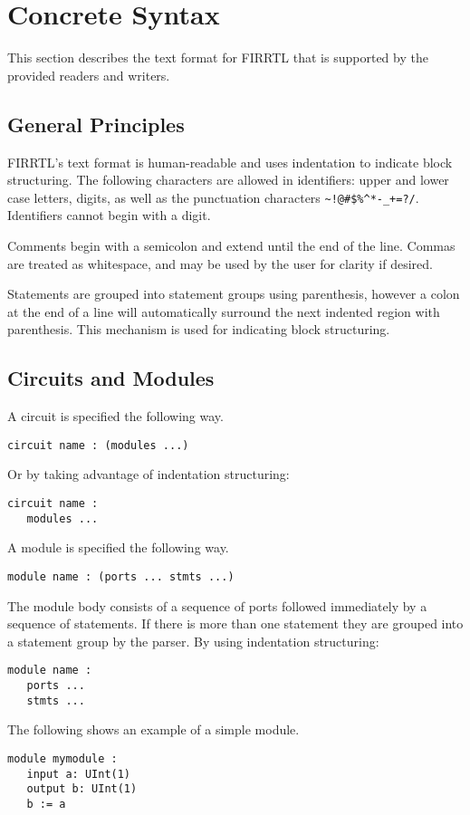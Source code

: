 \documentclass[12pt]{article}
\begin{document}
\section{Concrete Syntax}\label{concrete}
This section describes the text format for FIRRTL that is supported by the provided readers and writers.

\subsection*{General Principles}
FIRRTL's text format is human-readable and uses indentation to indicate block structuring.
The following characters are allowed in identifiers: upper and lower case letters, digits, as well as the punctuation characters \verb|~!@#$%^*-_+=?/|.
Identifiers cannot begin with a digit. 

Comments begin with a semicolon and extend until the end of the line.
Commas are treated as whitespace, and may be used by the user for clarity if desired. 

Statements are grouped into statement groups using parenthesis, however a colon at the end of a line will automatically surround the next indented region with parenthesis.
This mechanism is used for indicating block structuring. 

\subsection*{Circuits and Modules}
A circuit is specified the following way.
\begin{verbatim}
circuit name : (modules ...)
\end{verbatim}
Or by taking advantage of indentation structuring:
\begin{verbatim}
circuit name :
   modules ...
\end{verbatim}

A module is specified the following way.
\begin{verbatim}
module name : (ports ... stmts ...)
\end{verbatim}
The module body consists of a sequence of ports followed immediately by a sequence of statements.
If there is more than one statement they are grouped into a statement group by the parser. 
By using indentation structuring:
\begin{verbatim}
module name :
   ports ...
   stmts ...
\end{verbatim}

The following shows an example of a simple module.
\begin{verbatim}
module mymodule :
   input a: UInt(1)
   output b: UInt(1)
   b := a
\end{verbatim}
\end{document}
